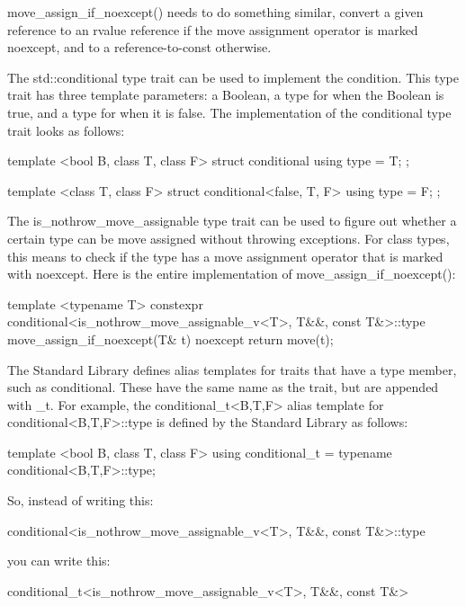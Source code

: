 move\_assign\_if\_noexcept() needs to do something similar, convert a given reference to an rvalue reference if the move assignment operator is marked noexcept, and to a reference-to-const otherwise.

The std::conditional type trait can be used to implement the condition. This type trait has three template parameters: a Boolean, a type for when the Boolean is true, and a type for when it is false. The implementation of the conditional type trait looks as follows:


\begin{cpp}
template <bool B, class T, class F>
struct conditional { using type = T; };

template <class T, class F>
struct conditional<false, T, F> { using type = F; };
\end{cpp}

The is\_nothrow\_move\_assignable type trait can be used to figure out whether a certain type can be move assigned without throwing exceptions. For class types, this means to check if the type has a move assignment operator that is marked with noexcept. Here is the entire implementation of move\_assign\_if\_noexcept():

\begin{cpp}
template <typename T>
constexpr conditional<is_nothrow_move_assignable_v<T>, T&&, const T&>::type
    move_assign_if_noexcept(T& t) noexcept
{
    return move(t);
}
\end{cpp}

The Standard Library defines alias templates for traits that have a type member, such as conditional. These have the same name as the trait, but are appended with \_t. For example, the conditional\_t<B,T,F> alias template for conditional<B,T,F>::type is defined by the Standard Library as follows:

\begin{cpp}
template <bool B, class T, class F>
using conditional_t = typename conditional<B,T,F>::type;
\end{cpp}

So, instead of writing this:

\begin{cpp}
conditional<is_nothrow_move_assignable_v<T>, T&&, const T&>::type
\end{cpp}

you can write this:

\begin{cpp}
conditional_t<is_nothrow_move_assignable_v<T>, T&&, const T&>
\end{cpp}

